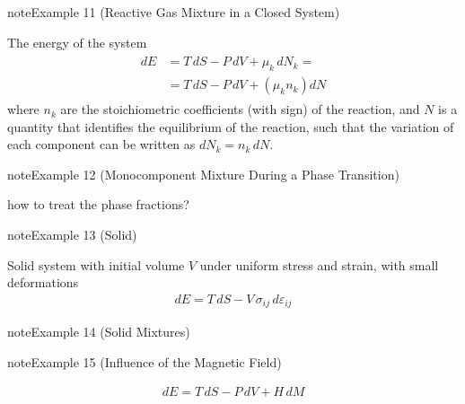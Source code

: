 \documentclass[letterpaper,10pt,english]{jupyterBook}
\begin{document}
\label{ch/principles-gibbs-phase-rule:example-14}
\begin{sphinxadmonition}{note}{Example 11 (Reactive Gas Mixture in a Closed System)}



\sphinxAtStartPar
The energy of the system
\begin{equation*}
\begin{split}
\begin{aligned}
  dE & = T \, dS - P \, dV + \mu_k \, dN_k = \\
     & = T \, dS - P \, dV + \left( \mu_k n_k \right) dN
\end{aligned}
\end{split}
\end{equation*}
\sphinxAtStartPar
where \( n_k \) are the stoichiometric coefficients (with sign) of the reaction, and \( N \) is a quantity that identifies the equilibrium of the reaction, such that the variation of each component can be written as \( dN_k = n_k \, dN \).
\end{sphinxadmonition}
\label{ch/principles-gibbs-phase-rule:example-15}
\begin{sphinxadmonition}{note}{Example 12 (Monocomponent Mixture During a Phase Transition)}



\sphinxAtStartPar
{} how to treat the phase fractions?
\end{sphinxadmonition}
\label{ch/principles-gibbs-phase-rule:example-16}
\begin{sphinxadmonition}{note}{Example 13 (Solid)}



\sphinxAtStartPar
Solid system with initial volume \( V \) under uniform stress and strain, with small deformations
\begin{equation*}
\begin{split}
dE = T \, dS - V \, \sigma_{ij} \, d \varepsilon_{ij}
\end{split}
\end{equation*}\end{sphinxadmonition}
\label{ch/principles-gibbs-phase-rule:example-17}
\begin{sphinxadmonition}{note}{Example 14 (Solid Mixtures)}



\sphinxAtStartPar
{}
\end{sphinxadmonition}
\label{ch/principles-gibbs-phase-rule:example-18}
\begin{sphinxadmonition}{note}{Example 15 (Influence of the Magnetic Field)}


\begin{equation*}
\begin{split}
dE = T \, dS - P \, d V + H \, dM
\end{split}
\end{equation*}
\sphinxAtStartPar
{}
\end{sphinxadmonition}
\end{document}
